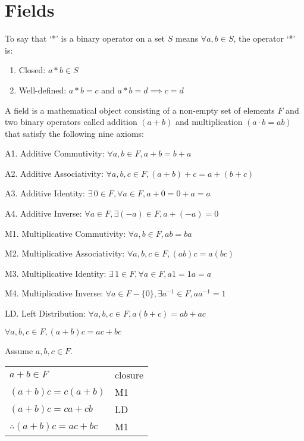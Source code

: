 \documentclass[letterpaper,12pt,fleqn]{article}
\begin{document}
\section*{Fields}

\begin{definition}
To say that `*' is a binary operator on a set $S$ means $\forall a,b\in S$, the
operator `*' is:
\begin{enumerate}
\item{Closed: $a*b\in S$}
\item{Well-defined: $a*b=c$ and $a*b=d\implies c=d$}
\end{enumerate}
\end{definition}

\begin{definition}
A field is a mathematical object consisting of a non-empty set of elements $F$
and two binary operators called addition $(a+b)$ and multiplication
$(a\cdot b=ab)$ that satisfy the following nine axioms:
\begin{description}
\item{A1. } Additive Commutivity: $\forall a,b\in F, a+b=b+a$
\item{A2. } Additive Associativity: $\forall a,b,c\in F, (a+b)+c=a+(b+c)$
\item{A3. } Additive Identity: $\exists\, 0\in F,\forall a\in F, a+0=0+a=a$
\item{A4. } Additive Inverse: $\forall a\in F, \exists (-a)\in F,a+(-a)=0$
\\
\item{M1. } Multiplicative Commutivity: $\forall a,b\in F, ab=ba$
\item{M2. } Multiplicative Associativity: $\forall a,b,c\in F, (ab)c=a(bc)$
\item{M3. } Multiplicative Identity: $\exists\, 1\in F,\forall a\in F, a1=1a=a$
\item{M4. } Multiplicative Inverse:
    $\forall a\in F-\{0\}, \exists a^{-1}\in F,aa^{-1}=1$
\\
\item{LD. } Left Distribution: $\forall a,b,c\in F, a(b+c)=ab+ac$
\end{description}
\end{definition}

\begin{theorem}
$\forall a,b,c\in F, (a+b)c=ac+bc$
\end{theorem}

\begin{theproof}
Assume $a,b,c\in F$. \\
\begin{tabular}{ll}
$a+b\in F$ & closure \\
$(a+b)c=c(a+b)$ & M1 \\
$(a+b)c=ca+cb$ & LD \\
$\therefore (a+b)c=ac+bc$ & M1 \\
\end{tabular}
\end{theproof}
\end{document}
